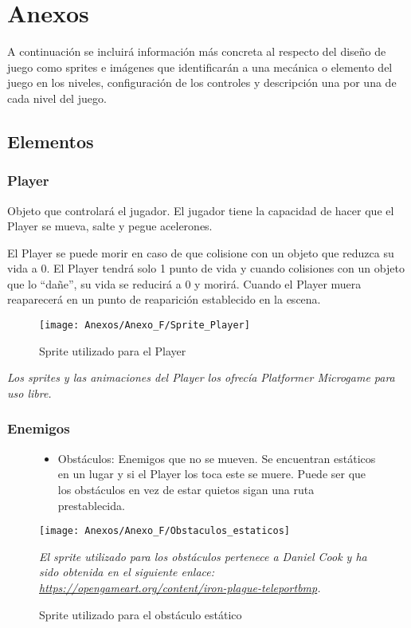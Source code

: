 \section{Anexos}
A continuación se incluirá información más concreta al respecto del diseño de juego como sprites e imágenes que identificarán a una mecánica o elemento del juego en los niveles, configuración de los controles y descripción una por una de cada nivel del juego.

\subsection{Elementos}
\subsubsection{Player}
Objeto que controlará el jugador. El jugador tiene la capacidad de hacer que el Player se mueva, salte y pegue acelerones.

El Player se puede morir en caso de que colisione con un objeto que reduzca su vida a 0. El Player tendrá solo 1 punto de vida y cuando colisiones con un objeto que lo “dañe”, su vida se reducirá a 0 y morirá. Cuando el Player muera reaparecerá en un punto de reaparición establecido en la escena.

\begin{figure}[h]
\centering
\texttt{[image: Anexos/Anexo\_F/Sprite\_Player]}
\caption{Sprite utilizado para el Player}
\end{figure}
\raggedright
\textit{Los sprites y las animaciones del Player los ofrecía Platformer Microgame para uso libre.}

\subsubsection{Enemigos}
\begin{figure}[h]
\begin{itemize}
\item
Obstáculos: Enemigos que no se mueven. Se encuentran estáticos en un lugar y si el Player los toca este se muere. Puede ser que los obstáculos en vez de estar quietos sigan una ruta prestablecida.
\end{itemize}
\centering
\texttt{[image: Anexos/Anexo\_F/Obstaculos\_estaticos]}
\caption{Sprite utilizado para el obstáculo estático}
\raggedright
\textit{El sprite utilizado para los obstáculos pertenece a Daniel Cook y ha sido obtenida en el siguiente enlace: \url{https://opengameart.org/content/iron-plague-teleportbmp}.}
\end{figure}


